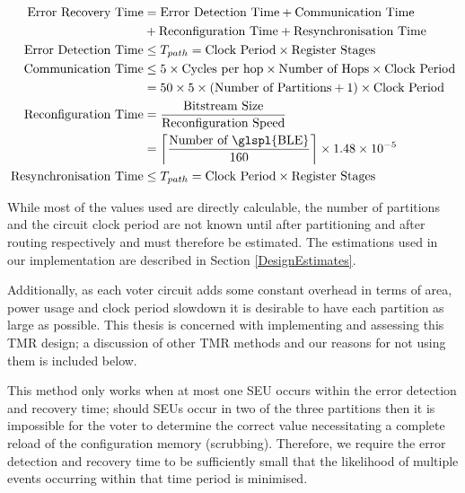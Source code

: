 \documentclass[12pt,final,oneside,a4paper]{dwThesis} %
\begin{document}
   \begin{align}
      \mbox{Error Recovery Time} &=\mbox{Error Detection Time} +\mbox{Communication Time} \notag\\
      &+\mbox{Reconfiguration Time} + \mbox{Resynchronisation Time}\notag\\
      \mbox{Error Detection Time} &\le T_{path} = \mbox{Clock
         Period}\times\mbox{Register Stages}\notag\\
      \mbox{Communication Time}
      &\le 5\times \mbox{Cycles per hop}\times\mbox{Number of Hops}\times \mbox{Clock Period}\notag\\
      &= 50\times 5\times (\mbox{Number of
         Partitions}+1)\times \mbox{Clock Period}\notag\\
      \mbox{Reconfiguration
         Time} &= \frac{\mbox{Bitstream
            Size}}{\mbox{Reconfiguration Speed}}\notag\\
      &=\left\lceil \frac{\mbox{Number of
            \glspl{BLE}}}{160}\right\rceil\times 1.48\times10^{-5}\notag\\
      \mbox{Resynchronisation Time} &\le T_{path} = \mbox{Clock
         Period}\times\mbox{Register Stages}\notag\\
   \end{align}
   
   While most of the values used are directly calculable, the number of partitions and the circuit clock period are
   not known until after partitioning and after routing respectively and must therefore be estimated.
   The estimations used in our implementation are described in Section \ref{DesignEstimates}.


   Additionally, as each voter circuit adds some constant overhead in terms of
   area, power usage and clock period slowdown it is desirable to have each
   partition as large as possible. This thesis is concerned with implementing
   and assessing this \gls{TMR} design; a discussion of other \gls{TMR} methods
   and our reasons for not using them is included below.

   This method only works when at most one \gls{SEU} occurs within the error
   detection and recovery time; should \glspl{SEU} occur in two of the three
   partitions then it is impossible for the voter to determine the correct
   value necessitating a complete reload of the configuration memory
   (\gls{scrubbing}). Therefore, we require the error detection and recovery
   time to be sufficiently small that the likelihood of multiple events
   occurring within that time period is minimised.
\end{document}
